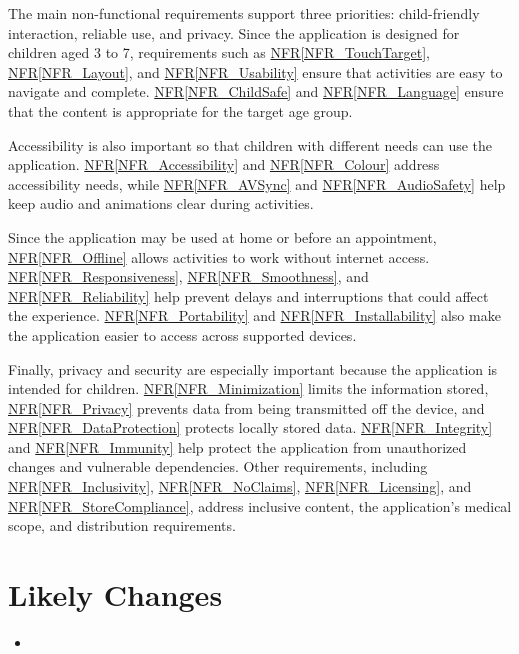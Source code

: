\documentclass[12pt]{article}
\newcommand{\nfrref}[1]{\hyperref[#1]{NFR\ref*{#1}}}
\newcounter{lcnum} %
\begin{document}
The main non-functional requirements support three priorities: child-friendly
interaction, reliable use, and privacy. Since the application is designed for
children aged 3 to 7, requirements such as \nfrref{NFR_TouchTarget},
\nfrref{NFR_Layout}, and \nfrref{NFR_Usability} ensure that activities are
easy to navigate and complete. \nfrref{NFR_ChildSafe} and
\nfrref{NFR_Language} ensure that the content is appropriate for the target
age group.

Accessibility is also important so that children with different needs can
use the application. \nfrref{NFR_Accessibility} and \nfrref{NFR_Colour}
address accessibility needs, while \nfrref{NFR_AVSync} and
\nfrref{NFR_AudioSafety} help keep audio and animations clear during
activities.

Since the application may be used at home or before an appointment,
\nfrref{NFR_Offline} allows activities to work without internet access.
\nfrref{NFR_Responsiveness}, \nfrref{NFR_Smoothness}, and
\nfrref{NFR_Reliability} help prevent delays and interruptions that could
affect the experience. \nfrref{NFR_Portability} and
\nfrref{NFR_Installability} also make the application easier to access
across supported devices.

Finally, privacy and security are especially important because the
application is intended for children. \nfrref{NFR_Minimization} limits
the information stored, \nfrref{NFR_Privacy} prevents data from being
transmitted off the device, and \nfrref{NFR_DataProtection} protects
locally stored data. \nfrref{NFR_Integrity} and \nfrref{NFR_Immunity}
help protect the application from unauthorized changes and vulnerable
dependencies. Other requirements, including \nfrref{NFR_Inclusivity},
\nfrref{NFR_NoClaims}, \nfrref{NFR_Licensing}, and
\nfrref{NFR_StoreCompliance}, address inclusive content, the application's
medical scope, and distribution requirements.

\section{Likely Changes}    

\noindent \begin{itemize}

\item[LC\refstepcounter{lcnum}\thelcnum\label{LC_meaningfulLabel}:] 

\end{itemize}
\end{document}
